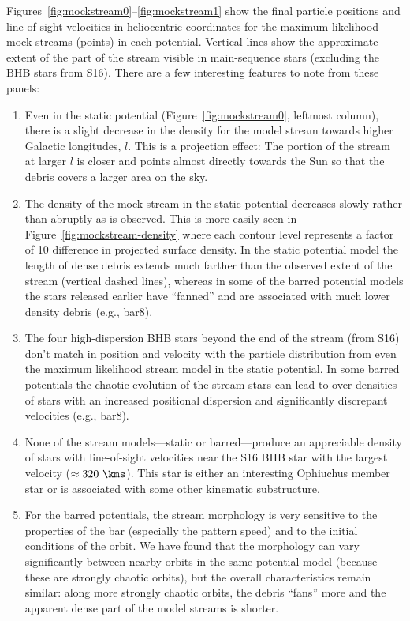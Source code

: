\documentclass[letterpaper,12pt,preprint]{aastex}
\begin{document}
Figures~\ref{fig:mockstream0}--\ref{fig:mockstream1} show the final particle positions and line-of-sight velocities in heliocentric coordinates for the maximum likelihood mock streams (points) in each potential. Vertical lines show the approximate extent of the part of the stream visible in main-sequence stars (excluding the BHB stars from S16).  There are a few interesting features to note from these panels:
\begin{enumerate}
	\item Even in the static potential (Figure~\ref{fig:mockstream0}, leftmost column), there is a slight decrease in the density for the model stream towards higher Galactic longitudes, $l$. This is a projection effect: The portion of the stream at larger $l$ is closer and points almost directly towards the Sun so that the debris covers a larger area on the sky.
	\item The density of the mock stream in the static potential decreases slowly rather than abruptly as is observed. This is more easily seen in Figure~\ref{fig:mockstream-density} where each contour level represents a factor of 10 difference in projected surface density. In the static potential model the length of dense debris extends much farther than the observed extent of the stream (vertical dashed lines), whereas in some of the barred potential models the stars released earlier have ``fanned'' and are associated with much lower density debris (e.g., bar8).
	\item The four high-dispersion BHB stars beyond the end of the stream (from S16) don't match in position and velocity with the particle distribution from even the maximum likelihood stream model in the static potential. In some barred potentials the chaotic evolution of the stream stars can lead to over-densities of stars with an increased positional dispersion and significantly discrepant velocities (e.g., bar8).
	\item None of the stream models---static or barred---produce an appreciable density of stars with line-of-sight velocities near the S16 BHB star with the largest velocity ($\approx 320~\kms$). This star is either an interesting Ophiuchus member star or is associated with some other kinematic substructure.
	\item For the barred potentials, the stream morphology is very sensitive to the properties of the bar (especially the pattern speed) and to the initial conditions of the orbit. We have found that the morphology can vary significantly between nearby orbits in the same potential model (because these are strongly chaotic orbits), but the overall characteristics remain similar: along more strongly chaotic orbits, the debris ``fans'' more and the apparent dense part of the model streams is shorter.
\end{enumerate}
\end{document}
